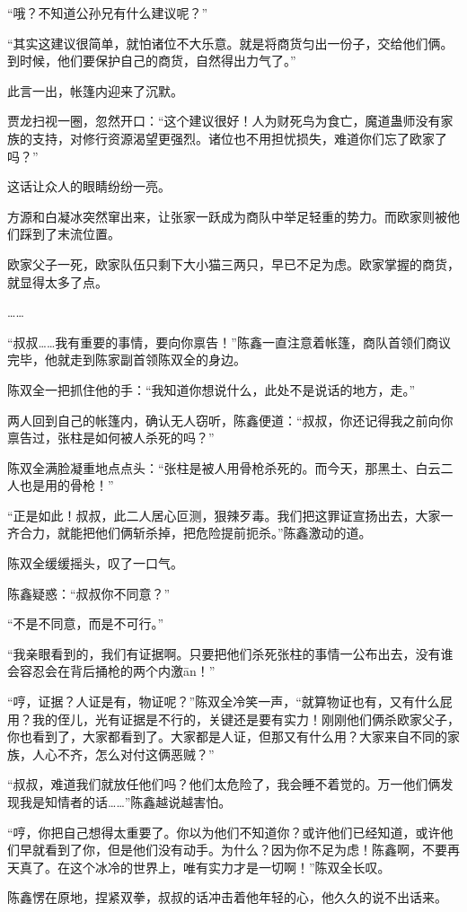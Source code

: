 \begin{this_body}
“哦？不知道公孙兄有什么建议呢？”

“其实这建议很简单，就怕诸位不大乐意。就是将商货匀出一份子，交给他们俩。到时候，他们要保护自己的商货，自然得出力气了。”

此言一出，帐篷内迎来了沉默。

贾龙扫视一圈，忽然开口：“这个建议很好！人为财死鸟为食亡，魔道蛊师没有家族的支持，对修行资源渴望更强烈。诸位也不用担忧损失，难道你们忘了欧家了吗？”

这话让众人的眼睛纷纷一亮。

方源和白凝冰突然窜出来，让张家一跃成为商队中举足轻重的势力。而欧家则被他们踩到了末流位置。

欧家父子一死，欧家队伍只剩下大小猫三两只，早已不足为虑。欧家掌握的商货，就显得太多了点。

……

“叔叔……我有重要的事情，要向你禀告！”陈鑫一直注意着帐篷，商队首领们商议完毕，他就走到陈家副首领陈双全的身边。

陈双全一把抓住他的手：“我知道你想说什么，此处不是说话的地方，走。”

两人回到自己的帐篷内，确认无人窃听，陈鑫便道：“叔叔，你还记得我之前向你禀告过，张柱是如何被人杀死的吗？”

陈双全满脸凝重地点点头：“张柱是被人用骨枪杀死的。而今天，那黑土、白云二人也是用的骨枪！”

“正是如此！叔叔，此二人居心叵测，狠辣歹毒。我们把这罪证宣扬出去，大家一齐合力，就能把他们俩斩杀掉，把危险提前扼杀。”陈鑫激动的道。

陈双全缓缓摇头，叹了一口气。

陈鑫疑惑：“叔叔你不同意？”

“不是不同意，而是不可行。”

“我亲眼看到的，我们有证据啊。只要把他们杀死张柱的事情一公布出去，没有谁会容忍会在背后捅枪的两个内激ān！”

“哼，证据？人证是有，物证呢？”陈双全冷笑一声，“就算物证也有，又有什么屁用？我的侄儿，光有证据是不行的，关键还是要有实力！刚刚他们俩杀欧家父子，你也看到了，大家都看到了。大家都是人证，但那又有什么用？大家来自不同的家族，人心不齐，怎么对付这俩恶贼？”

“叔叔，难道我们就放任他们吗？他们太危险了，我会睡不着觉的。万一他们俩发现我是知情者的话……”陈鑫越说越害怕。

“哼，你把自己想得太重要了。你以为他们不知道你？或许他们已经知道，或许他们早就看到了你，但是他们没有动手。为什么？因为你不足为虑！陈鑫啊，不要再天真了。在这个冰冷的世界上，唯有实力才是一切啊！”陈双全长叹。

陈鑫愣在原地，捏紧双拳，叔叔的话冲击着他年轻的心，他久久的说不出话来。

\end{this_body}

